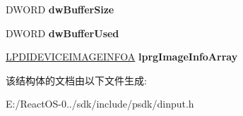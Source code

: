 \begin{DoxyCompactItemize}
\mbox{\label{struct___d_i_d_e_v_i_c_e_i_m_a_g_e_i_n_f_o_h_e_a_d_e_r_a_a6fd8e16ec9292b44a81ff9c52cfd0973}} 
D\+W\+O\+RD {\bfseries dw\+Buffer\+Size}
\item 
\mbox{\label{struct___d_i_d_e_v_i_c_e_i_m_a_g_e_i_n_f_o_h_e_a_d_e_r_a_accc85427b911fabece16f02a1f2ec05d}} 
D\+W\+O\+RD {\bfseries dw\+Buffer\+Used}
\item 
\mbox{\label{struct___d_i_d_e_v_i_c_e_i_m_a_g_e_i_n_f_o_h_e_a_d_e_r_a_ab24e492dd635df1e94bedc9a62227c02}} 
\hyperlink{struct___d_i_d_e_v_i_c_e_i_m_a_g_e_i_n_f_o_a}{L\+P\+D\+I\+D\+E\+V\+I\+C\+E\+I\+M\+A\+G\+E\+I\+N\+F\+OA} {\bfseries lprg\+Image\+Info\+Array}
\end{DoxyCompactItemize}


该结构体的文档由以下文件生成\+:\begin{DoxyCompactItemize}
\item 
E\+:/\+React\+O\+S-\/0../sdk/include/psdk/dinput.\+h\end{DoxyCompactItemize}
